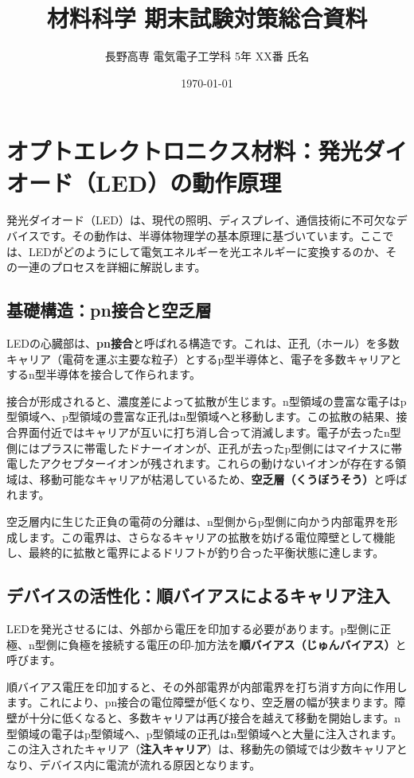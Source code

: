 \documentclass[11pt,a4paper]{ltjsarticle}
\title{材料科学 期末試験対策総合資料}
\author{長野高専 電気電子工学科 5年 XX番 氏名}
\date{\today}
\begin{document}
\maketitle
\thispagestyle{fancy}

\section{オプトエレクトロニクス材料：発光ダイオード（LED）の動作原理}

発光ダイオード（LED）は、現代の照明、ディスプレイ、通信技術に不可欠なデバイスです。その動作は、半導体物理学の基本原理に基づいています。ここでは、LEDがどのようにして電気エネルギーを光エネルギーに変換するのか、その一連のプロセスを詳細に解説します。

\subsection{基礎構造：pn接合と空乏層}

LEDの心臓部は、\textbf{pn接合}と呼ばれる構造です。これは、正孔（ホール）を多数キャリア（電荷を運ぶ主要な粒子）とするp型半導体と、電子を多数キャリアとするn型半導体を接合して作られます\cite{ref1}。

接合が形成されると、濃度差によって拡散が生じます。n型領域の豊富な電子はp型領域へ、p型領域の豊富な正孔はn型領域へと移動します。この拡散の結果、接合界面付近ではキャリアが互いに打ち消し合って消滅します。電子が去ったn型側にはプラスに帯電したドナーイオンが、正孔が去ったp型側にはマイナスに帯電したアクセプターイオンが残されます。これらの動けないイオンが存在する領域は、移動可能なキャリアが枯渇しているため、\textbf{空乏層（くうぼうそう）}と呼ばれます\cite{ref1}。

空乏層内に生じた正負の電荷の分離は、n型側からp型側に向かう内部電界を形成します。この電界は、さらなるキャリアの拡散を妨げる電位障壁として機能し、最終的に拡散と電界によるドリフトが釣り合った平衡状態に達します。

\subsection{デバイスの活性化：順バイアスによるキャリア注入}

LEDを発光させるには、外部から電圧を印加する必要があります。p型側に正極、n型側に負極を接続する電圧の印-加方法を\textbf{順バイアス（じゅんバイアス）}と呼びます\cite{ref1}。

順バイアス電圧を印加すると、その外部電界が内部電界を打ち消す方向に作用します。これにより、pn接合の電位障壁が低くなり、空乏層の幅が狭まります\cite{ref2}。障壁が十分に低くなると、多数キャリアは再び接合を越えて移動を開始します。n型領域の電子はp型領域へ、p型領域の正孔はn型領域へと大量に注入されます。この注入されたキャリア（\textbf{注入キャリア}）は、移動先の領域では少数キャリアとなり、デバイス内に電流が流れる原因となります\cite{ref2}。
\end{document}
